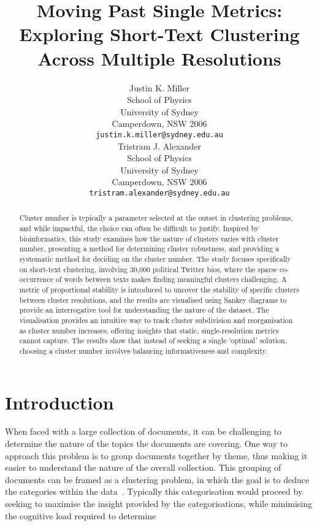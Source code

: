 \documentclass{article}
\title{Moving Past Single Metrics: Exploring Short-Text Clustering Across Multiple Resolutions}
\author{
 Justin K. Miller \\
  School of Physics\\
  University of Sydney\\
  Camperdown, NSW 2006 \\
  \texttt{justin.k.miller@sydney.edu.au} \\
   \And
 Tristram J. Alexander \\
  School of Physics\\
  University of Sydney\\
  Camperdown, NSW 2006 \\
  \texttt{tristram.alexander@sydney.edu.au} \\
}
\begin{document}
\maketitle




\begin{abstract} 
Cluster number is typically a parameter selected at the outset in clustering problems, and while impactful, the choice can often be difficult to justify. Inspired by bioinformatics, this study examines how the nature of clusters varies with cluster number, presenting a method for determining cluster robustness, and providing a systematic method for deciding on the cluster number.  The study focuses specifically on short-text clustering, involving 30,000 political Twitter bios, where the sparse co-occurrence of words between texts makes finding meaningful clusters challenging.  A metric of proportional stability is introduced to uncover the stability of specific clusters between cluster resolutions, and the results are visualised using Sankey diagrams to provide an interrogative tool for understanding the nature of the dataset.  The visualisation provides an intuitive way to track cluster subdivision and reorganisation as cluster number increases, offering insights that static, single-resolution metrics cannot capture.  The results show that instead of seeking a single ‘optimal’ solution, choosing a cluster number involves balancing informativeness and complexity.




\end{abstract}


\section{Introduction}

When faced with a large collection of documents, it can be challenging to determine the nature of the topics the documents are covering.  One way to approach this problem is to group documents together by theme, thus making it easier to understand the nature of the overall collection.  This grouping of documents can be framed as a clustering problem, in which the goal is to deduce the categories within the data~\cite{van2023white}.  Typically this categorisation would proceed by seeking to maximise the insight provided by the categorisations, while minimising the cognitive load required to determine
\end{document}
